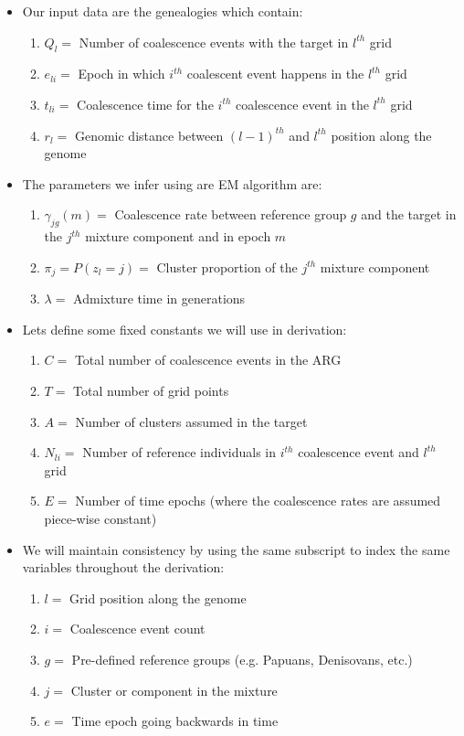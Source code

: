 \begin{itemize}    
    \item Our input data are the genealogies which contain:
    \begin{enumerate}
        \item $Q_l =$ Number of coalescence events with the target in $l^{th}$ grid
        \item $e_{li} =$ Epoch in which $i^{th}$ coalescent event happens in the $l^{th}$ grid
        \item $t_{li} =$ Coalescence time for the $i^{th}$ coalescence event in the $l^{th}$ grid
        \item $r_{l} =$ Genomic distance between $(l-1)^{th}$ and $l^{th}$ position along the genome
    \end{enumerate}

    \item The parameters we infer using are EM algorithm are:
    \begin{enumerate}
        \item $\gamma_{jg}(m) =$ Coalescence rate between reference group $g$ and the target in the $j^{th}$ mixture component and in epoch $m$
        \item $\pi_j  = P(z_l = j) =$ Cluster proportion of the $j^{th}$ mixture component
        \item $\lambda =$ Admixture time in generations 
    \end{enumerate}

    \item Lets define some fixed constants we will use in derivation:
    \begin{enumerate}
        \item $C =$ Total number of coalescence events in the ARG
        \item $T =$ Total number of grid points
        \item $A =$ Number of clusters assumed in the target
        \item $N_{li} =$ Number of reference individuals in $i^{th}$ coalescence event and $l^{th}$ grid
        \item $E =$ Number of time epochs (where the coalescence rates are assumed piece-wise constant)
    \end{enumerate}

    \item We will maintain consistency by using the same subscript to index the same variables throughout the derivation:
    \begin{enumerate}
        \item $l =$ Grid position along the genome
        \item $i =$ Coalescence event count
        \item $g =$ Pre-defined reference groups (e.g. Papuans, Denisovans, etc.)
        \item $j =$ Cluster or component in the mixture
        \item $e =$ Time epoch going backwards in time
    \end{enumerate}


\end{itemize}
